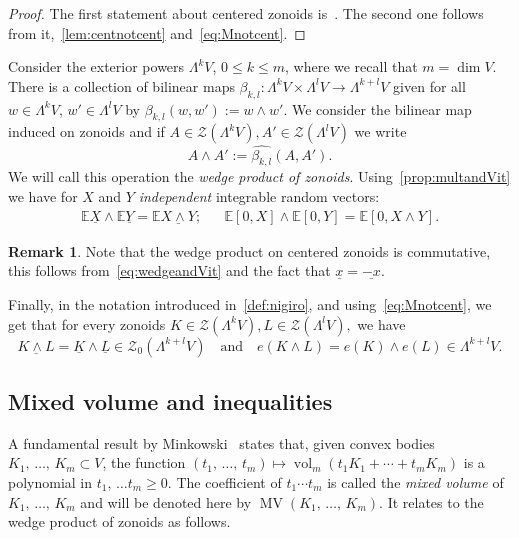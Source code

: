 \documentclass[10pt]{amsart}
\theoremstyle{definition}\newtheorem{defi}[theo]{Definition}\newtheorem{rema}[theo]{Remark}\newtheorem{exam}[theo]{Example}\newtheorem{exem}[theo]{Example}\newtheorem{nota}[theo]{Notation}
\newcommand{\EE}{\mathbb{E}}
\newcommand{\ZZ}{\mathscr{Z}}
\newcommand{\ZZo}{\mathscr{Z}_0}
\DeclareMathOperator{\vol}{vol}
\DeclareMathOperator{\MV}{MV}
\newcommand{\seg}{\underline}
\begin{document}
\begin{proof}
The first statement about centered zonoids is~\cite[Corollary~4.3]{ZA}. The second one follows from it,~\cref{lem:centnotcent} and~\eqref{eq:Mnotcent}.
\end{proof}

Consider the exterior powers $\Lambda^k V$, $0\leq k \leq m$, where we recall that $m=\dim V$. There is a collection of bilinear maps $\beta_{k,l}:\Lambda^k V\times \Lambda^l V\to \Lambda^{k+l} V$ given for all $w\in \Lambda^k V$, $w'\in\Lambda^l V$ by $\beta_{k,l}(w,w'):=w\wedge w'$. We consider the bilinear map induced on zonoids and if $A\in\ZZ(\Lambda^k V),A'\in\ZZ(\Lambda^l V)$ we write
\begin{equation*}
A\wedge A':=\widehat{\beta_{k,l}}(A,A').
\end{equation*}
We will call this operation the \emph{wedge product of zonoids}. Using~\cref{prop:multandVit} we have for $X$ and $Y$ \emph{independent} integrable random vectors:
\begin{align}\label{eq:wedgeandVit}
\EE\seg{X}\wedge\EE\seg{Y}=\EE\seg{X\wedge Y}; && \EE[0,X]\wedge \EE[0,Y]=\EE[0,X\wedge Y].
\end{align}

\begin{rema}
Note that the wedge product on centered zonoids is commutative, this follows from~\eqref{eq:wedgeandVit} and the fact that $\seg{x}=\seg{-x}$.
\end{rema}

Finally, in the notation introduced in~\cref{def:nigiro}, and using~\eqref{eq:Mnotcent}, we get that for every zonoids $K\in\ZZ(\Lambda^kV),L\in\ZZ(\Lambda^lV),$ we have
\begin{equation*}
\seg{K\wedge L}=\seg{K}\wedge\seg{L}\in \ZZo\left(\Lambda^{k+l}V\right)\quad\text{and}\quad e(K\wedge L)=e(K)\wedge e(L)\in\Lambda^{k+l}V.
\end{equation*}


\subsection{Mixed volume and inequalities}\label{sec:MV}

A fundamental result by Minkowski~\cite[Theorem~5.1.7]{bible} states that, given convex bodies $K_1,\,\ldots,\,K_m\subset V$, the function $(t_1,\,\ldots,\,t_m)\mapsto \vol_m(t_1K_1+\cdots+t_mK_m)$ is a polynomial in $t_1,\,\ldots t_m\geq0$. The coefficient of $t_1\cdots t_m$ is called the \emph{mixed volume} of $K_1,\,\ldots,\,K_m$ and will be denoted here by $\MV(K_1,\,\ldots,\,K_m).$ It relates to the wedge product of zonoids as follows.
\end{document}
